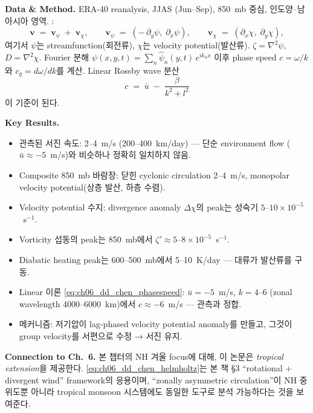 \medskip
\noindent\textbf{Data \& Method.}\quad
ERA-40 reanalysis, JJAS (Jun--Sep), 850~mb 중심, 인도양--남아시아 영역.
:
\begin{equation}\label{eq:ch06_dd_chen_helmholtz}
  \mathbf{v} \;=\; \mathbf{v}_\psi \;+\; \mathbf{v}_\chi,
  \qquad
  \mathbf{v}_\psi \;=\; (-\,\partial_y\psi,\;\partial_x\psi),
  \qquad
  \mathbf{v}_\chi \;=\; (\partial_x\chi,\;\partial_y\chi),
\end{equation}
여기서 $\psi$는 streamfunction(회전류), $\chi$는 velocity potential(발산류).
$\zeta = \nabla^2\psi$, $D = \nabla^2\chi$.
Fourier 분해 $\psi(x,y,t) = \sum_n \hat\psi_n(y,t)\,e^{ik_n x}$ 이후
phase speed $c = \omega/k$와  $c_g = d\omega/dk$를 계산.
Linear Rossby wave 분산
\begin{equation}\label{eq:ch06_dd_chen_phasespeed}
  c \;=\; \bar u \;-\; \frac{\beta}{k^2 + l^2}
\end{equation}
이 기준이 된다.

\medskip
\noindent\textbf{Key Results.}
\begin{itemize}
  \item 관측된 서진 속도: 2--4~m/s (200--400~km/day) --- 단순 environment flow
        ($\bar u \approx -5$~m/s)와 비슷하나 정확히 일치하지 않음.
  \item Composite 850~mb 바람장: 닫힌 cyclonic circulation 2--4~m/s, monopolar
        velocity potential(상층 발산, 하층 수렴).
  \item Velocity potential 수지: divergence anomaly $\Delta\chi$의 peak는
        성숙기 $5$--$10\times 10^{-5}$~s$^{-1}$.
  \item Vorticity 섭동의 peak는 850~mb에서 $\zeta' \approx 5$--$8\times 10^{-5}$~s$^{-1}$.
  \item Diabatic heating peak는 600--500~mb에서 5--10~K/day --- 대류가 발산류를 구동.
  \item Linear 이론 \eqref{eq:ch06_dd_chen_phasespeed}: $\bar u = -5$~m/s, $k = 4$--$6$
        (zonal wavelength 4000--6000~km)에서 $c \approx -6$~m/s --- 관측과 정합.
  \item 메커니즘: 저기압이 lag-phased velocity potential anomaly를 만들고,
        그것이 group velocity를 서편으로 수정 → 서진 유지.
\end{itemize}

\medskip
\noindent\textbf{Connection to Ch.~6.}\quad
본 챕터의 NH 겨울 focus에 대해, 이 논문은 \emph{tropical extension}을 제공한다.
\eqref{eq:ch06_dd_chen_helmholtz}는 본 책 \S3
``rotational + divergent wind'' framework의 응용이며, ``zonally asymmetric
circulation''이 NH 중위도뿐 아니라 tropical monsoon 시스템에도 동일한 도구로 분석
가능하다는 것을 보여준다.

